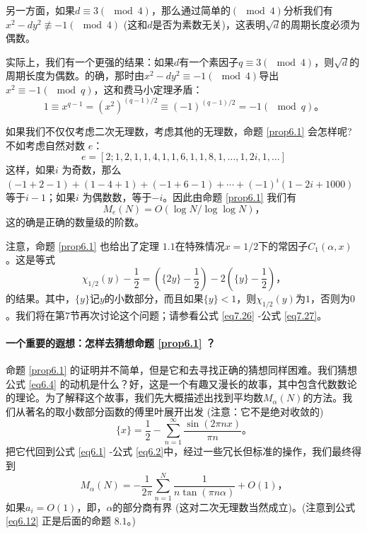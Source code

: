 \documentclass[11pt,a4paper]{article}
\theoremstyle{definition}
\newcommand{\refeq}[1]{公式 \ref{#1}}
\newcommand{\refprop}[1]{命题 \ref{#1}}
\numberwithin{equation}{section}
\newcommand{\comma}{\text{，}}
\newcommand{\juhao}{\text{。}}
\begin{document}
    另一方面，如果$ d\equiv3\left(\!\!\mod4\right) $，那么通过简单的$\left(\!\!\mod4\right)  $分析我们有$ x^{2}-dy^{2}\not\equiv-1\left(\!\!\mod4\right) $  (这和$ d $是否为素数无关)，这表明$ \sqrt{d} $的周期长度必须为偶数。
    
    实际上，我们有一个更强的结果：如果$ d $有一个素因子$ q\equiv3\left(\!\!\mod4\right) $，则$ \sqrt{d} $的周期长度为偶数。的确，那时由$ x^{2}-dy^{2}\equiv-1\left(\!\!\mod4\right) $导出$ x^{2}\equiv-1\left(\!\!\mod{q}\right)$，这和费马小定理矛盾：
     \[ 1\equiv x^{q-1}={\left(x^{2}\right)}^{\left(q-1\right)/2}\equiv{\left(-1\right)}^{\left(q-1\right)/2}=-1\left(\!\!\!\!\mod{q}\right)\juhao\]
     
     如果我们不仅仅考虑二次无理数，考虑其他的无理数，\refprop{prop6.1} 会怎样呢? 不如考虑自然对数 $ e $：
      \[ e=\left[2;1,2,1,1,4,1,1,6,1,1,8,1,\ldots,1,2i,1,\ldots\right] \]
      这样，如果$ i $ 为奇数，那么$\left(-1+2-1\right)+ \left(1-4+1\right)+\left(-1+6-1\right)+\cdots+\left(-1\right)^{i}\left(1-2i+1000\right) $等于$ i-
       1$；如果$ i $ 为偶数数，等于$ -i $。因此由\refprop{prop6.1} 我们有
       \begin{equation}\label{eq6.10}
       	M_{e}\left(N\right)=O\left(\log N/\log\log N\right)\comma
       \end{equation}这的确是正确的数量级的阶数。
       
      注意，\refprop{prop6.1} 也给出了定理 $ 1.1 $在特殊情况$ x=1/2 $下的常因子$ C_{1}\left(\alpha,x\right) $。这是等式
       \[ \chi_{1/2}\left(y\right)-\dfrac{1}{2}=\left(\lbrace2y\rbrace-\dfrac{1}{2}\right)-2\left(\lbrace y\rbrace-\dfrac{1}{2}\right)\comma\]
       的结果。其中，$ \lbrace y\rbrace $记$ y $的小数部分，而且如果$ \lbrace y\rbrace<1 $，则$ \chi_{1/2}\left(y\right) $为$ 1 $，否则为$ 0 $。我们将在第7节再次讨论这个问题；请参看\refeq{eq7.26} -\refeq{eq7.27}。

\paragraph{一个重要的遐想：怎样去猜想\refprop{prop6.1} ？} \refprop{prop6.1} 的证明并不简单，但是它和去寻找正确的猜想同样困难。我们猜想\refeq{eq6.4} 的动机是什么？好，这是一个有趣又漫长的故事，其中包含代数数论的理论。为了解释这个故事，我们先大概描述出找到平均数$ M_{\alpha}\left(N\right) $的方法。我们从著名的取小数部分函数的傅里叶展开出发 (注意：它不是绝对收敛的)
\begin{equation}\label{eq6.11}
	\lbrace x\rbrace=\dfrac{1}{2}-\sum_{n=1}^{\infty}\dfrac{\sin\left(2\pi nx\right)}{\pi n}\juhao
\end{equation}
把它代回到\refeq{eq6.1} -\refeq{eq6.2}中，经过一些冗长但标准的操作，我们最终得到
\begin{equation}\label{eq6.12}
	M_{\alpha}\left(N\right)=-\dfrac{1}{2\pi}\sum_{n=1}^{N}\dfrac{1}{n\tan\left(\pi n\alpha\right)}+O\left(1\right)\comma
\end{equation}
如果$ a_{i}=O\left(1\right) $，即，$ \alpha $的部分商有界 (这对二次无理数当然成立)。(注意到\refeq{eq6.12} 正是后面的命题 $ 8.1 $。)
\end{document}
